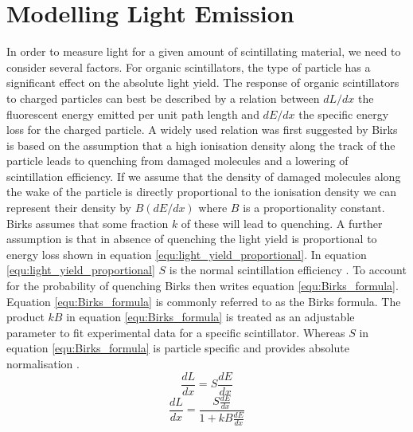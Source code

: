\begin{figure}[!h]
\begin{minipage}{.45\textwidth}
  \label{fig:individualDarkNoiseOld}
\end{minipage}
\end{figure}

\section{Modelling Light Emission}\label{sec:GEANT4Simulation_ModellingLightEmission}
In order to measure light for a given amount of scintillating material, we need to consider several factors. For organic scintillators, the type of particle has a significant effect on the absolute light yield. The response of organic scintillators to charged particles can best be described by a relation between $dL/dx$ the fluorescent energy emitted per unit path length and $dE/dx$ the specific energy loss for the charged particle.  A widely used relation was first suggested by Birks \cite{birks_1964} is based on the assumption that a high ionisation density along the track of the particle leads to quenching from damaged molecules and a lowering of  scintillation efficiency. If we assume that the density of damaged molecules along the wake of the particle is directly proportional to the ionisation density we can represent their density by $B(dE/dx)$ where $B$ is a proportionality constant. Birks assumes that some fraction $k$ of these will lead to quenching\cite{knoll_2010}. A further assumption is that in absence of quenching the light yield is proportional to energy loss shown in equation \ref{equ:light_yield_proportional}. In equation \ref{equ:light_yield_proportional} $S$ is the normal scintillation efficiency \cite{birks_1964}. To account for the probability of quenching Birks then writes equation \ref{equ:Birks_formula}. Equation \ref{equ:Birks_formula} is commonly referred to as the Birks formula. The product $kB$ in equation \ref{equ:Birks_formula} is treated as an adjustable parameter to fit experimental data for a specific scintillator. Whereas $S$ in equation \ref{equ:Birks_formula} is particle specific and provides absolute normalisation \cite{knoll_2010}.  
\begin{equation}
\frac{dL}{dx} = S\frac{dE}{dx}
\label{equ:light_yield_proportional}
\end{equation}
\begin{equation}
\frac{dL}{dx} = \frac{S\frac{dE}{dx}}{1 + kB \frac{dE}{dx}}
\label{equ:Birks_formula}
\end{equation}
